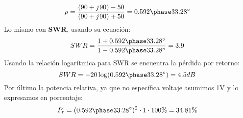 \documentclass[
	12pt, %
	fleqn, %
	a4paper, %
	oneside, %
]{LegrandOrangeBook}
\begin{document}
\begin{example}
\begin{displaymath}
\rho=\frac{(90+\iu 90)-50}{(90+\iu 90)+50}=\fase{0.592}{33.28}
\end{displaymath}
Lo mismo con \textbf{SWR}, usando su ecuación:
\begin{displaymath}
SWR=\frac{1+\fase{0.592}{33.28}}{1-\fase{0.592}{33.28}}=3.9
\end{displaymath}
Usando la relación logarítmica para SWR se encuentra la pérdida por retorno:
\begin{displaymath}
SWR=-20\log(\fase{0.592}{33.28})=4.5dB
\end{displaymath}
Por último la potencia relativa, ya que no específica voltaje asumimos 1V y lo expresamos en porcentaje:
\begin{displaymath}
P_r=(\fase{0.592}{33.28})^2\cdot 1\cdot 100\%=34.81\%
\end{displaymath}
\end{example}
\end{document}
